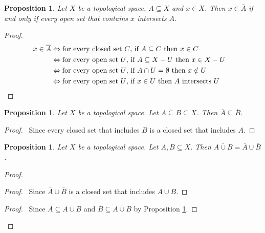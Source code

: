 \documentclass{book}
\let\qed\relax
\newtheorem{prop}[ax]{Proposition}
\theoremstyle{definition}
\begin{document}
\begin{prop}
\label{prop:closure}
Let $X$ be a topological space, $A \subseteq X$ and $x \in X$. Then $x \in \overline{A}$ if and only if every open set that contains $x$ intersects $A$.
\end{prop}

\begin{proof}
\pf
\begin{align*}
x \in \overline{A} & \Leftrightarrow \text{for every closed set $C$, if $A \subseteq C$ then $x \in C$} \\
& \Leftrightarrow \text{for every open set $U$, if $A \subseteq X - U$ then $x \in X - U$} \\
& \Leftrightarrow \text{for every open set $U$, if $A \cap U = \emptyset$ then $x \notin U$} \\
& \Leftrightarrow \text{for every open set $U$, if $x \in U$ then $A$ intersects $U$} & \qed
\end{align*}
\end{proof}

\begin{prop}
\label{prop:closure_monotone}
Let $X$ be a topological space. Let $A \subseteq B \subseteq X$. Then $\overline{A} \subseteq \overline{B}$.
\end{prop}

\begin{proof}
\pf\ Since every closed set that includes $B$ is a closed set that includes $A$. \qed
\end{proof}

\begin{prop}
Let $X$ be a topological space. Let $A,B \subseteq X$. Then $\overline{A \cup B} = \overline{A} \cup \overline{B}$.
\end{prop}

\begin{proof}
\pf
{}
\begin{proof}
\pf\ Since $\overline{A} \cup \overline{B}$ is a closed set that includes $A \cup B$.
\end{proof}
\begin{proof}
	\pf\ Since $\overline{A} \subseteq \overline{A \cup B}$ and $\overline{B} \subseteq \overline{A \cup B}$ by Proposition \ref{prop:closure_monotone}.
\end{proof}
\qed
\end{proof}
\end{document}
